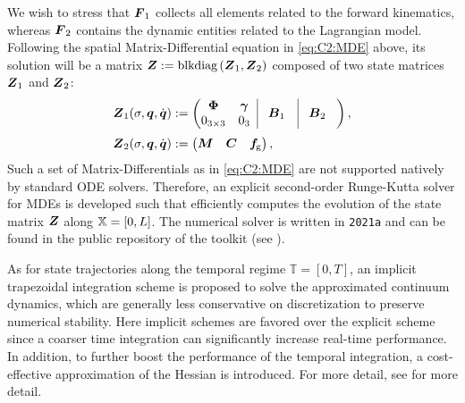 %
%   
%
We wish to stress that $\boldsymbol{F}_1$ collects all elements related to the forward kinematics, whereas $\boldsymbol{F}_2$ contains the dynamic entities related to the Lagrangian model. Following the spatial Matrix-Differential equation in \eqref{eq:C2:MDE} above, its solution will be a matrix $\boldsymbol{Z} := \text{blkdiag}\left( \boldsymbol{Z}_1, \boldsymbol{Z}_2 \right)$ composed of two state matrices $\boldsymbol{Z}_1$ and $\boldsymbol{Z}_2$:
%
\begin{align}
\mat{Z}_1(\sigma,\q,\dq) & := \begin{pmatrix}
\begin{matrix}
\PhiB  & \gammaB \\ 0_{3\times3} &  0_{3}
\end{matrix} \;\; \vrule & \!\mat{B}_1 & \vrule & \!\mat{B}_2 \;\;\;
 \end{pmatrix}, \\[0.25em]
\mat{Z}_2(\sigma,\q,\dq) & := \begin{pmatrix} \mat{M} & \mat{C} & \mat{f}\!\grav \end{pmatrix},
\end{align}
%
Such a set of Matrix-Differentials as in \eqref{eq:C2:MDE} are not supported natively by standard ODE solvers. Therefore, an explicit second-order Runge-Kutta solver for MDEs is developed such that efficiently computes the evolution of the state matrix $\boldsymbol{Z}$ along $\mathbb{X} = [0,L]$. The numerical solver is written in \matlab \texttt{2021a} and can be found in the public repository of the \sorotoki toolkit (see \cite{SorotokiCode}).

As for state trajectories along the temporal regime $\mathbb{T} = [0,T]$, an implicit trapezoidal integration scheme is proposed to solve the approximated continuum dynamics, which are generally less conservative on discretization to preserve numerical stability. Here implicit schemes are favored over the explicit scheme since a coarser time integration can significantly increase real-time performance. In addition, to further boost the performance of the temporal integration, a cost-effective approximation of the Hessian is introduced. For more detail, see  for more detail.
